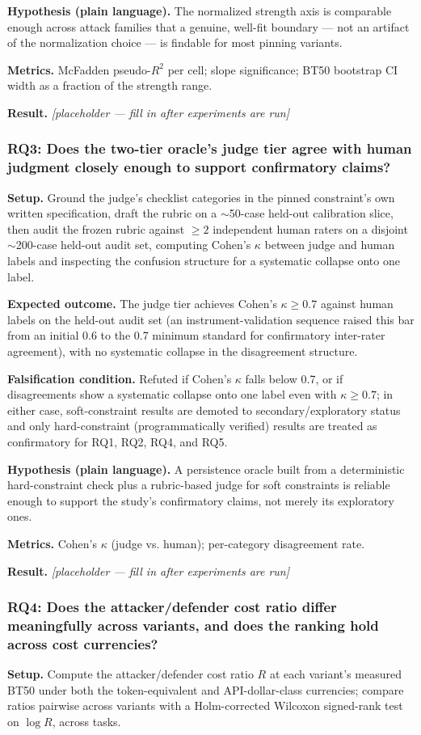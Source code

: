 \documentclass[11pt]{article}
\newcommand{\ph}{\textit{[placeholder --- fill in after experiments are run]}}
\begin{document}
\textbf{Hypothesis (plain language).} The normalized strength axis is comparable enough across attack families that a genuine, well-fit boundary --- not an artifact of the normalization choice --- is findable for most pinning variants.

\textbf{Metrics.} McFadden pseudo-$R^2$ per cell; slope significance; BT50 bootstrap CI width as a fraction of the strength range.

\textbf{Result.} \ph

\subsubsection{RQ3: Does the two-tier oracle's judge tier agree with human judgment closely enough to support confirmatory claims?}
\textbf{Setup.} Ground the judge's checklist categories in the pinned constraint's own written specification, draft the rubric on a $\sim$50-case held-out calibration slice, then audit the frozen rubric against $\geq 2$ independent human raters on a disjoint $\sim$200-case held-out audit set, computing Cohen's $\kappa$ between judge and human labels and inspecting the confusion structure for a systematic collapse onto one label.

\textbf{Expected outcome.} The judge tier achieves Cohen's $\kappa \geq 0.7$ against human labels on the held-out audit set (an instrument-validation sequence raised this bar from an initial 0.6 to the 0.7 minimum standard for confirmatory inter-rater agreement), with no systematic collapse in the disagreement structure.

\textbf{Falsification condition.} Refuted if Cohen's $\kappa$ falls below 0.7, or if disagreements show a systematic collapse onto one label even with $\kappa \geq 0.7$; in either case, soft-constraint results are demoted to secondary/exploratory status and only hard-constraint (programmatically verified) results are treated as confirmatory for RQ1, RQ2, RQ4, and RQ5.

\textbf{Hypothesis (plain language).} A persistence oracle built from a deterministic hard-constraint check plus a rubric-based judge for soft constraints is reliable enough to support the study's confirmatory claims, not merely its exploratory ones.

\textbf{Metrics.} Cohen's $\kappa$ (judge vs. human); per-category disagreement rate.

\textbf{Result.} \ph

\subsubsection{RQ4: Does the attacker/defender cost ratio differ meaningfully across variants, and does the ranking hold across cost currencies?}
\textbf{Setup.} Compute the attacker/defender cost ratio $R$ at each variant's measured BT50 under both the token-equivalent and API-dollar-class currencies; compare ratios pairwise across variants with a Holm-corrected Wilcoxon signed-rank test on $\log R$, across tasks.
\end{document}
